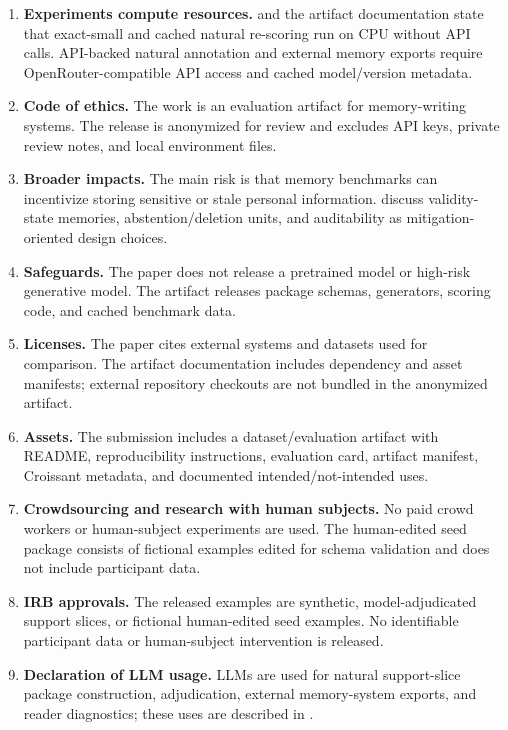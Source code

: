 \begin{enumerate}[leftmargin=1.5em,itemsep=4pt]
\item \textbf{Experiments compute resources.} \answerYes{}  and the artifact documentation state that exact-small and cached natural re-scoring run on CPU without API calls. API-backed natural annotation and external memory exports require OpenRouter-compatible API access and cached model/version metadata.

\item \textbf{Code of ethics.} \answerYes{} The work is an evaluation artifact for memory-writing systems. The release is anonymized for review and excludes API keys, private review notes, and local environment files.

\item \textbf{Broader impacts.} \answerYes{} The main risk is that memory benchmarks can incentivize storing sensitive or stale personal information.  discuss validity-state memories, abstention/deletion units, and auditability as mitigation-oriented design choices.

\item \textbf{Safeguards.} \answerNA{} The paper does not release a pretrained model or high-risk generative model. The artifact releases package schemas, generators, scoring code, and cached benchmark data.

\item \textbf{Licenses.} \answerYes{} The paper cites external systems and datasets used for comparison. The artifact documentation includes dependency and asset manifests; external repository checkouts are not bundled in the anonymized artifact.

\item \textbf{Assets.} \answerYes{} The submission includes a dataset/evaluation artifact with README, reproducibility instructions, evaluation card, artifact manifest, Croissant metadata, and documented intended/not-intended uses.

\item \textbf{Crowdsourcing and research with human subjects.} \answerNA{} No paid crowd workers or human-subject experiments are used. The human-edited seed package consists of fictional examples edited for schema validation and does not include participant data.

\item \textbf{IRB approvals.} \answerNA{} The released examples are synthetic, model-adjudicated support slices, or fictional human-edited seed examples. No identifiable participant data or human-subject intervention is released.

\item \textbf{Declaration of LLM usage.} \answerYes{} LLMs are used for natural support-slice package construction, adjudication, external memory-system exports, and reader diagnostics; these uses are described in .
\end{enumerate}
